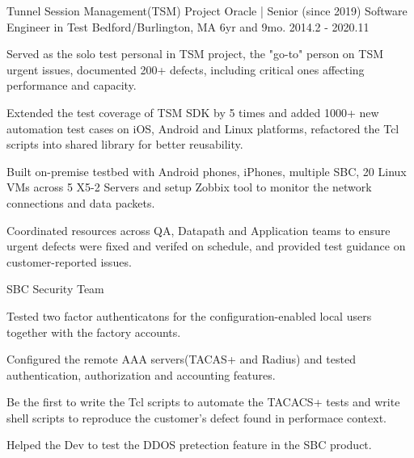 


\begin{cventries}



\cventry
{Tunnel Session Management(TSM) Project} %
{Oracle | Senior (since 2019) Software Engineer in Test} %
{Bedford/Burlington, MA} %
{6yr and 9mo. 2014.2 - 2020.11} %
{ %
\begin{cvitems}
\item {Served as the solo test personal in TSM project, the "go-to" person on TSM urgent issues, documented 200+ defects, including critical ones affecting performance and capacity.}
\item {Extended the test coverage of TSM SDK by 5 times and added 1000+ new automation test cases on iOS, Android and Linux platforms, refactored the Tcl scripts into shared library for better reusability.}
\item {Built on-premise testbed with Android phones, iPhones, multiple SBC, 20 Linux VMs across 5 X5-2 Servers and setup Zobbix tool to monitor the network connections and data packets.}
\item {Coordinated resources across QA, Datapath and Application teams to ensure urgent defects were fixed and verifed on schedule, and provided test guidance on customer-reported issues.}
\end{cvitems}
}

\cventry
{SBC Security Team} %
{} %
{} %
{} %
{ %
\begin{cvitems}
\item {Tested two factor authenticatons for the configuration-enabled local users together with the factory accounts.}
\item {Configured the remote AAA servers(TACAS+ and Radius) and tested authentication, authorization and accounting features.}
\item {Be the first to write the Tcl scripts to automate the TACACS+ tests and write shell scripts to reproduce the customer’s defect found in performace context.}
\item {Helped the Dev to test the DDOS pretection feature in the SBC product.}
\end{cvitems}
}


\end{cventries}
